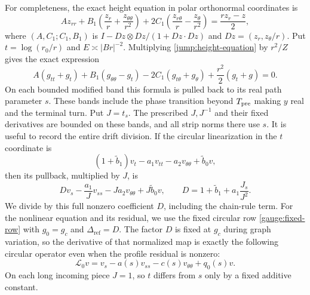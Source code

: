 For completeness, the exact height equation in polar orthonormal
coordinates is
\begin{equation}\label{jump:height-equation}
 A z_{rr}+B_1\left(\frac{z_r}{r}+
                 \frac{z_{\theta\theta}}{r^2}\right)
 +2C_1\left(\frac{z_{r\theta}}r-
                 \frac{z_\theta}{r^2}\right)
 =\frac{rz_r-z}{2},
\end{equation}
where $(A,C_1;C_1,B_1)$ is
$I-Dz\otimes Dz/(1+Dz\cdot Dz)$ and
$Dz=(z_r,z_\theta/r)$.  Put $t=\log(r_0/r)$ and
$E\asymp|Br|^{-2}$.  Multiplying \eqref{jump:height-equation} by
$r^2/Z$ gives the exact expression
\begin{equation}\label{jump:log-height}
 A(g_{tt}+g_t)+B_1(g_{\theta\theta}-g_t)
 -2C_1(g_{t\theta}+g_\theta)
 +\frac{r^2}{2}(g_t+g)=0.
\end{equation}
On each bounded modified band this formula is pulled back to its
real path parameter $s$.  These bands include the phase transition
beyond $T_{\rm pre}$ making $y$ real and the terminal turn.  Put $J=t_s$.
The prescribed $J,J^{-1}$ and their fixed derivatives are bounded
on these bands, and all strip norms
there use $s$.  It is useful to record the entire drift division.
If the circular linearization in the $t$ coordinate is
\[
 (1+\widetilde b_1)v_t-a_1v_{tt}
                -a_2v_{\theta\theta}+\widetilde b_0v,
\]
then its pullback, multiplied by $J$, is
\[
 Dv_s-\frac{a_1}{J}v_{ss}
       -Ja_2v_{\theta\theta}+J\widetilde b_0v,\qquad
 D=1+\widetilde b_1+a_1\frac{J_s}{J^2}.
\]
We divide by this full nonzero coefficient $D$, including the
chain-rule term.  For the nonlinear equation and its residual, we use the
fixed circular row \eqref{gauge:fixed-row} with $g_0=g_c$ and
$\Delta_{\mathrm{ref}}=D$.  The factor $D$ is fixed at $g_c$ during graph
variation, so the derivative of that normalized map is exactly the
following circular operator even when the profile residual is nonzero:
\begin{equation}\label{jump:height-linear}
 \mathcal L_0v=v_s-a(s)v_{ss}-c(s)v_{\theta\theta}+q_0(s)v.
\end{equation}
On each long incoming piece $J=1$, so $t$ differs from $s$ only
by a fixed additive constant.

